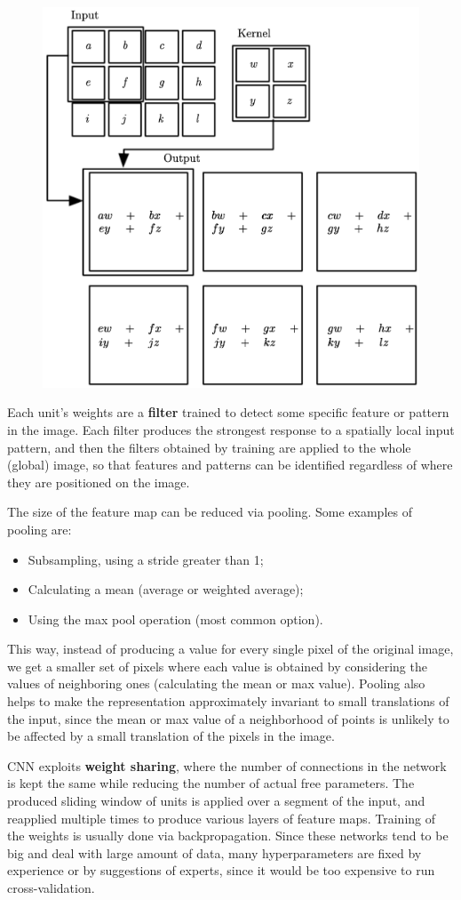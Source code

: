 \begin{figure}[ht]
    \centering
    \includegraphics[width=0.5\linewidth]{img/CNN_matrix.png}
\end{figure}
Each unit's weights are a \textbf{filter} trained to detect some specific feature or pattern in the image. Each filter produces the strongest response to a spatially local input pattern, and then the filters obtained by training are applied to the whole (global) image, so that features and patterns can be identified regardless of where they are positioned on the image.

The size of the feature map can be reduced via pooling. Some examples of pooling are:
\begin{itemize}
    \item Subsampling, using a stride greater than 1;
    \item Calculating a mean (average or weighted average);
    \item Using the max pool operation (most common option).
\end{itemize}
This way, instead of producing a value for every single pixel of the original image, we get a smaller set of pixels where each value is obtained by considering the values of neighboring ones (calculating the mean or max value). Pooling also helps to make the representation approximately invariant to small translations of the input, since the mean or max value of a neighborhood of points is unlikely to be affected by a small translation of the pixels in the image.

CNN exploits \textbf{weight sharing}, where the number of connections in the network is kept the same while reducing the number of actual free parameters. The produced sliding window of units is applied over a segment of the input, and reapplied multiple times to produce various layers of feature maps. Training of the weights is usually done via backpropagation. Since these networks tend to be big and deal with large amount of data, many hyperparameters are fixed by experience or by suggestions of experts, since it would be too expensive to run cross-validation.

